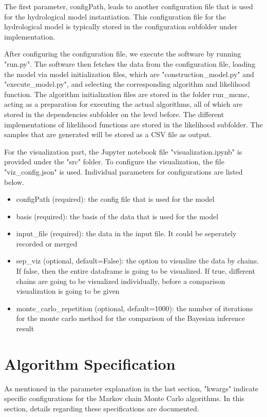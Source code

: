 The first parameter, configPath, leads to another configuration file that is used for the hydrological model instantiation. This configuration file for the hydrological model is typically stored in the configuration subfolder under implementation.

After configuring the configuration file, we execute the software by running "run.py". The software then fetches the data from the configuration file, loading the model via model initialization files, which are "construction\_model.py" and "execute\_model.py", and selecting the corresponding algorithm and likelihood function. The algorithm initialization files are stored in the folder run\_mcmc, acting as a preparation for executing the actual algorithms, all of which are stored in the dependencies subfolder on the level before. The different implementations of likelihood functions are stored in the likelihood subfolder. The samples that are generated will be stored as a CSV file as output.

For the visualization part, the Jupyter notebook file "visualization.ipynb" is provided under the "src" folder. To configure the visualization, the file "viz\_config.json" is used. Individual parameters for configurations are listed below.

\begin{itemize}
    \item configPath (required): the config file that is used for the model
    \item basis (required): the basis of the data that is used for the model
    \item input\_file (required): the data in the input file. It could be seperately recorded or merged
    \item sep\_viz (optional, default=False): the option to visualize the data by chains. If false, then the entire dataframe is going to be visualized. If true, different chains are going to be visualized individually, before a comparison visualization is going to be given
    \item monte\_carlo\_repetition (optional, default=1000): the number of iterations for the monte carlo method for the comparison of the Bayesian inference result 
\end{itemize}

\section{Algorithm Specification}
As mentioned in the parameter explanation in the last section, "kwargs" indicate specific configurations for the Markov chain Monte Carlo algorithms. In this section, details regarding these specifications are documented.

